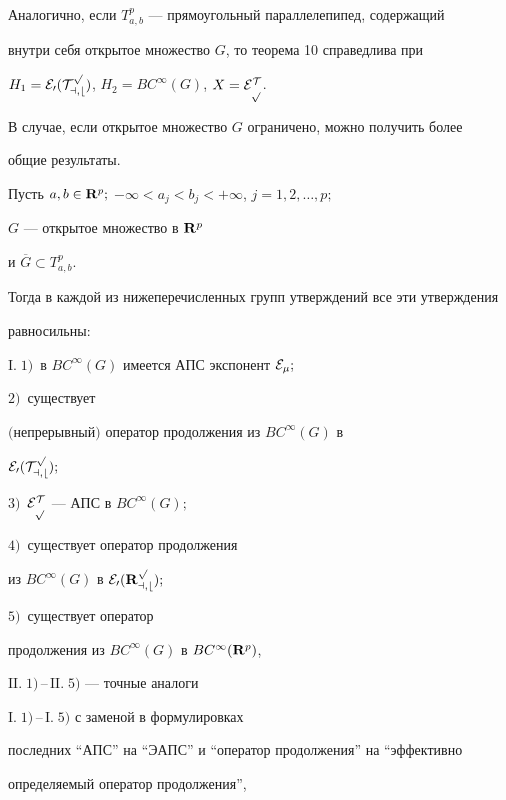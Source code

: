 Аналогично, если $T^p_{a,b}$ --- прямоугольный параллелепипед, содержащий


внутри себя открытое множество $G$, то теорема 10 справедлива при


$H_1=\cal{E}_0(T^p_{a,b})$, $H_2=BC^{\infty}(G)$, $X=\cal{E}^T_p$.





В случае, если открытое множество $G$ ограничено, можно получить более


общие результаты.








\begin{thm}


Пусть $a,b\in {\bold R}^p;$ $-\infty<a_j<b_j<+\infty$, $j=1,2,\dotsc,p;$


$G$ --- открытое множество в ${\bold R}^p$ 


и $\overline{G}\subset T^p_{a,b}$.


Тогда в каждой из нижеперечисленных групп утверждений все эти утверждения


равносильны\/${:}$





$\mathrm I.\; 1)$~в $BC^{\infty}(G)$ имеется АПС экспонент $\cal{E}_{\mu};$


$2)$~существует


$($непрерывный$)$ оператор продолжения из $BC^{\infty}(G)$ в


$\cal{E}_0(T^p_{a,b});$


$3)$~$\cal{E}^T_p$ --- АПС в $BC^{\infty}(G);$


$4)$~существует оператор продолжения


из $BC^{\infty}(G)$ в $\cal{E}_0({\bold R}^p_{a,b});$


$5)$~существует оператор


продолжения из $BC^{\infty}(G)$ в $BC^{\infty}({\bold R}^p)$,





$\mathrm{II}.\; 1)$\,--\,$\mathrm{II}.\; 5)$ --- точные аналоги


$\mathrm{I}.\; 1)$\,--\,$\mathrm{I}.\; 5)$ с заменой в формулировках


последних ``АПС''  на ``ЭАПС''  и ``оператор продолжения''  на ``эффективно


определяемый оператор продолжения'',






\end{thm}
